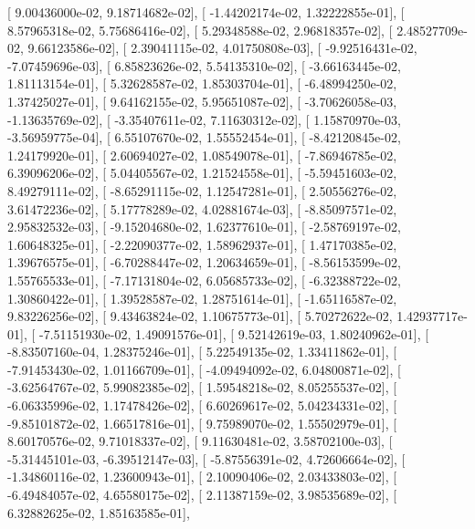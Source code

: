 \documentclass{article}
\begin{document}
       [  9.00436000e-02,   9.18714682e-02],
       [ -1.44202174e-02,   1.32222855e-01],
       [  8.57965318e-02,   5.75686416e-02],
       [  5.29348588e-02,   2.96818357e-02],
       [  2.48527709e-02,   9.66123586e-02],
       [  2.39041115e-02,   4.01750808e-03],
       [ -9.92516431e-02,  -7.07459696e-03],
       [  6.85823626e-02,   5.54135310e-02],
       [ -3.66163445e-02,   1.81113154e-01],
       [  5.32628587e-02,   1.85303704e-01],
       [ -6.48994250e-02,   1.37425027e-01],
       [  9.64162155e-02,   5.95651087e-02],
       [ -3.70626058e-03,  -1.13635769e-02],
       [ -3.35407611e-02,   7.11630312e-02],
       [  1.15870970e-03,  -3.56959775e-04],
       [  6.55107670e-02,   1.55552454e-01],
       [ -8.42120845e-02,   1.24179920e-01],
       [  2.60694027e-02,   1.08549078e-01],
       [ -7.86946785e-02,   6.39096206e-02],
       [  5.04405567e-02,   1.21524558e-01],
       [ -5.59451603e-02,   8.49279111e-02],
       [ -8.65291115e-02,   1.12547281e-01],
       [  2.50556276e-02,   3.61472236e-02],
       [  5.17778289e-02,   4.02881674e-03],
       [ -8.85097571e-02,   2.95832532e-03],
       [ -9.15204680e-02,   1.62377610e-01],
       [ -2.58769197e-02,   1.60648325e-01],
       [ -2.22090377e-02,   1.58962937e-01],
       [  1.47170385e-02,   1.39676575e-01],
       [ -6.70288447e-02,   1.20634659e-01],
       [ -8.56153599e-02,   1.55765533e-01],
       [ -7.17131804e-02,   6.05685733e-02],
       [ -6.32388722e-02,   1.30860422e-01],
       [  1.39528587e-02,   1.28751614e-01],
       [ -1.65116587e-02,   9.83226256e-02],
       [  9.43463824e-02,   1.10675773e-01],
       [  5.70272622e-02,   1.42937717e-01],
       [ -7.51151930e-02,   1.49091576e-01],
       [  9.52142619e-03,   1.80240962e-01],
       [ -8.83507160e-04,   1.28375246e-01],
       [  5.22549135e-02,   1.33411862e-01],
       [ -7.91453430e-02,   1.01166709e-01],
       [ -4.09494092e-02,   6.04800871e-02],
       [ -3.62564767e-02,   5.99082385e-02],
       [  1.59548218e-02,   8.05255537e-02],
       [ -6.06335996e-02,   1.17478426e-02],
       [  6.60269617e-02,   5.04234331e-02],
       [ -9.85101872e-02,   1.66517816e-01],
       [  9.75989070e-02,   1.55502979e-01],
       [  8.60170576e-02,   9.71018337e-02],
       [  9.11630481e-02,   3.58702100e-03],
       [ -5.31445101e-03,  -6.39512147e-03],
       [ -5.87556391e-02,   4.72606664e-02],
       [ -1.34860116e-02,   1.23600943e-01],
       [  2.10090406e-02,   2.03433803e-02],
       [ -6.49484057e-02,   4.65580175e-02],
       [  2.11387159e-02,   3.98535689e-02],
       [  6.32882625e-02,   1.85163585e-01],
\end{document}

